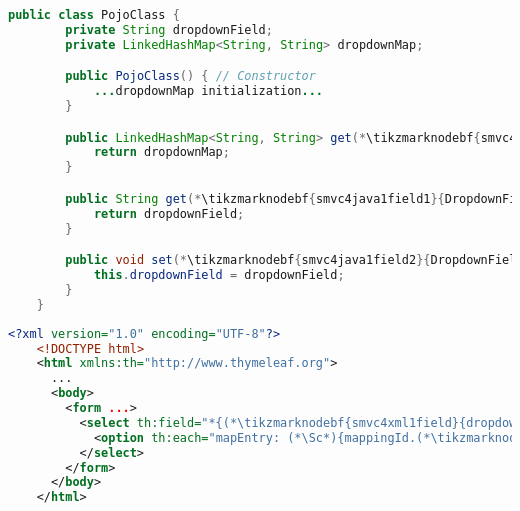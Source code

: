 \newpage

\begin{lstlisting}[language=Java, title={POJO class with one String field}]
    public class PojoClass {
        private String dropdownField;
        private LinkedHashMap<String, String> dropdownMap;

        public PojoClass() { // Constructor
            ...dropdownMap initialization...
        }

        public LinkedHashMap<String, String> get(*\tikzmarknodebf{smvc4java1map}{DropdownMap}*)() {
            return dropdownMap;
        }

        public String get(*\tikzmarknodebf{smvc4java1field1}{DropdownField}*)() {
            return dropdownField;
        }

        public void set(*\tikzmarknodebf{smvc4java1field2}{DropdownField}*)(String dropdownField) {
            this.dropdownField = dropdownField;
        }
    }
\end{lstlisting}
\begin{lstlisting}[language=XML, title={HTML form setting the field}]
    <?xml version="1.0" encoding="UTF-8"?>
    <!DOCTYPE html>
    <html xmlns:th="http://www.thymeleaf.org">
      ...
      <body>
        <form ...>
          <select th:field="*{(*\tikzmarknodebf{smvc4xml1field}{dropdownField}[ForestGreen]*)}">
            <option th:each="mapEntry: (*\Sc*){mappingId.(*\tikzmarknodebf{smvc4xml1map}{dropdownMap}[ForestGreen]*).entrySet()}" th:value="${mapEntry.key}" th:text="${mapEntry.value}"/>
          </select>
        </form>
      </body>
    </html>
\end{lstlisting}

